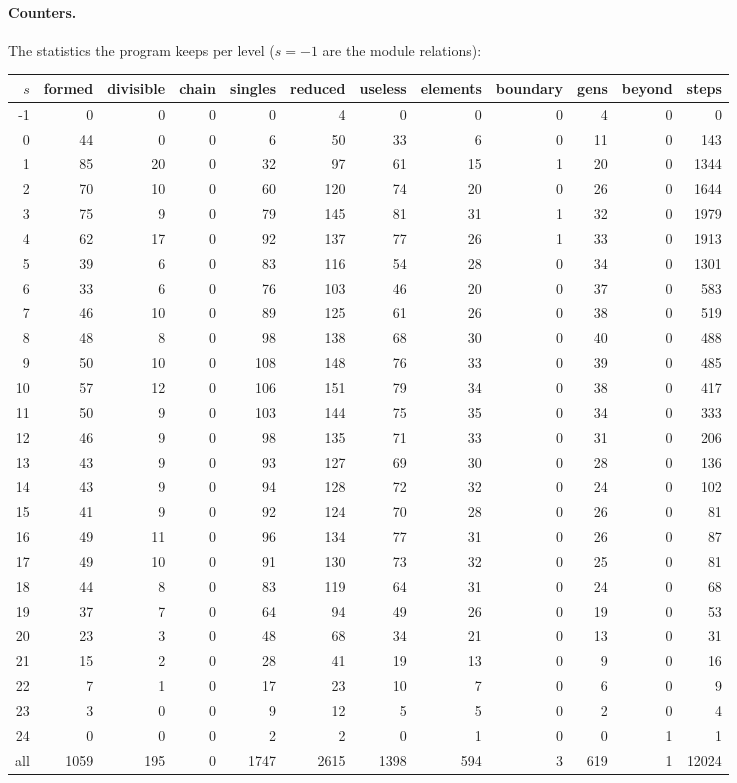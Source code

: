 \documentclass[11pt]{article}
\begin{document}
\paragraph{Counters.}
The statistics the program keeps per level ($s = -1$ are the module relations):
\begin{center}
\footnotesize\setlength{\tabcolsep}{3.5pt}
\begin{tabular}{rrrrrrrrrrrr}
\toprule
$s$ & formed & divisible & chain & singles & reduced & useless & elements & boundary & gens & beyond & steps \\
\midrule
-1 & 0 & 0 & 0 & 0 & 4 & 0 & 0 & 0 & 4 & 0 & 0 \\
0 & 44 & 0 & 0 & 6 & 50 & 33 & 6 & 0 & 11 & 0 & 143 \\
1 & 85 & 20 & 0 & 32 & 97 & 61 & 15 & 1 & 20 & 0 & 1344 \\
2 & 70 & 10 & 0 & 60 & 120 & 74 & 20 & 0 & 26 & 0 & 1644 \\
3 & 75 & 9 & 0 & 79 & 145 & 81 & 31 & 1 & 32 & 0 & 1979 \\
4 & 62 & 17 & 0 & 92 & 137 & 77 & 26 & 1 & 33 & 0 & 1913 \\
5 & 39 & 6 & 0 & 83 & 116 & 54 & 28 & 0 & 34 & 0 & 1301 \\
6 & 33 & 6 & 0 & 76 & 103 & 46 & 20 & 0 & 37 & 0 & 583 \\
7 & 46 & 10 & 0 & 89 & 125 & 61 & 26 & 0 & 38 & 0 & 519 \\
8 & 48 & 8 & 0 & 98 & 138 & 68 & 30 & 0 & 40 & 0 & 488 \\
9 & 50 & 10 & 0 & 108 & 148 & 76 & 33 & 0 & 39 & 0 & 485 \\
10 & 57 & 12 & 0 & 106 & 151 & 79 & 34 & 0 & 38 & 0 & 417 \\
11 & 50 & 9 & 0 & 103 & 144 & 75 & 35 & 0 & 34 & 0 & 333 \\
12 & 46 & 9 & 0 & 98 & 135 & 71 & 33 & 0 & 31 & 0 & 206 \\
13 & 43 & 9 & 0 & 93 & 127 & 69 & 30 & 0 & 28 & 0 & 136 \\
14 & 43 & 9 & 0 & 94 & 128 & 72 & 32 & 0 & 24 & 0 & 102 \\
15 & 41 & 9 & 0 & 92 & 124 & 70 & 28 & 0 & 26 & 0 & 81 \\
16 & 49 & 11 & 0 & 96 & 134 & 77 & 31 & 0 & 26 & 0 & 87 \\
17 & 49 & 10 & 0 & 91 & 130 & 73 & 32 & 0 & 25 & 0 & 81 \\
18 & 44 & 8 & 0 & 83 & 119 & 64 & 31 & 0 & 24 & 0 & 68 \\
19 & 37 & 7 & 0 & 64 & 94 & 49 & 26 & 0 & 19 & 0 & 53 \\
20 & 23 & 3 & 0 & 48 & 68 & 34 & 21 & 0 & 13 & 0 & 31 \\
21 & 15 & 2 & 0 & 28 & 41 & 19 & 13 & 0 & 9 & 0 & 16 \\
22 & 7 & 1 & 0 & 17 & 23 & 10 & 7 & 0 & 6 & 0 & 9 \\
23 & 3 & 0 & 0 & 9 & 12 & 5 & 5 & 0 & 2 & 0 & 4 \\
24 & 0 & 0 & 0 & 2 & 2 & 0 & 1 & 0 & 0 & 1 & 1 \\
all & 1059 & 195 & 0 & 1747 & 2615 & 1398 & 594 & 3 & 619 & 1 & 12024 \\
\bottomrule
\end{tabular}
\end{center}
\end{document}
